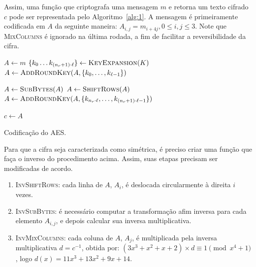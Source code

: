 \documentclass[12pt,notitlepage]{report}
\begin{document}
Assim, uma função que criptografa uma mensagem $m$ e retorna um texto cifrado
$c$ pode ser representada pelo Algoritmo~\ref{alg:1}. A mensagem é primeiramente
codificada em $A$ da seguinte maneira: $A_{i, j} = m_{i + 4j}, 0 \leq i, j \leq 3$.
Note que \textsc{MixColumns} é ignorado na última rodada, a fim de facilitar a
reversibilidade da cifra.

\begin{algorithm}[ht]
\vspace{2mm}
  $A \leftarrow m$\;
  $\{k_{0} \dots k_{(n_r + 1) \cdot \ell}\}
    \leftarrow \textsc{KeyExpansion}(K)$\;
  $A \leftarrow \textsc{AddRoundKey}(A,
    \{k_{0}, \dots, k_{\ell - 1}\})$\;


  $A \leftarrow \textsc{SubBytes}(A)$\;
  $A \leftarrow \textsc{ShiftRows}(A)$\;
  $A \leftarrow \textsc{AddRoundKey}(A,
    \{k_{n_r \cdot \ell}, \dots, k_{(n_r + 1) \cdot \ell - 1}\})$\;

  $c \leftarrow A$\;
  \vspace{2mm}
  \caption{Codificação do AES.}
  \label{alg:1}
\end{algorithm}

Para que a cifra seja caracterizada como simétrica, é preciso criar uma função
que faça o inverso do procedimento acima. Assim, suas etapas precisam ser
modificadas de acordo.

\begin{enumerate}[label=\roman*.]

  \item \textsc{InvShiftRows}: cada linha de $A$, $A_i$, é deslocada
      circularmente à direita $i$ vezes.

  \item \textsc{InvSubBytes}: é necessário computar a transformação afim
      inversa para cada elemento $A_{i,j}$, e depois calcular sua inversa
        multiplicativa.

  \item \textsc{InvMixColumns}: cada coluna de $A$, $A_j$, é multiplicada pela
      inversa multiplicativa $d = c^{-1}$, obtida por: $(3 x^{3} +
        x^{2} + x + 2) \times d \equiv 1 \pmod{x^{4} + 1}$, logo
        $d(x) = 11 x^{3} + 13 x^{2} + 9 x + 14$.

\end{enumerate}
\end{document}
